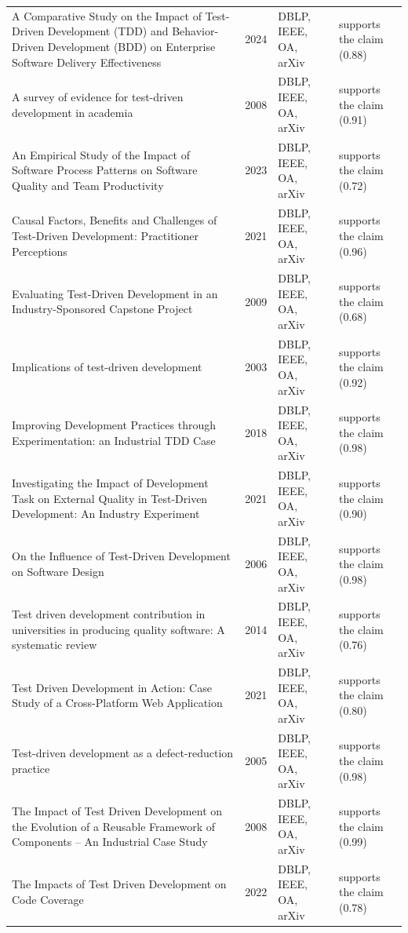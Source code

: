 \begin{longtable}{@{}%
  >{\raggedright\arraybackslash}p{}c%
  >{\raggedright\arraybackslash}p{}%
  >{\raggedright\arraybackslash}p{}@{}}
A Comparative Study on the Impact of Test-Driven Development (TDD) and Behavior-Driven Development (BDD) on Enterprise Software Delivery Effectiveness & 2024 & DBLP, IEEE, OA, arXiv & supports the claim (0.88) \\
A survey of evidence for test-driven development in academia & 2008 & DBLP, IEEE, OA, arXiv & supports the claim (0.91) \\
An Empirical Study of the Impact of Software Process Patterns on Software Quality and Team Productivity & 2023 & DBLP, IEEE, OA, arXiv & supports the claim (0.72) \\
Causal Factors, Benefits and Challenges of Test-Driven Development: Practitioner Perceptions & 2021 & DBLP, IEEE, OA, arXiv & supports the claim (0.96) \\
Evaluating Test-Driven Development in an Industry-Sponsored Capstone Project & 2009 & DBLP, IEEE, OA, arXiv & supports the claim (0.68) \\
Implications of test-driven development & 2003 & DBLP, IEEE, OA, arXiv & supports the claim (0.92) \\
Improving Development Practices through Experimentation: an Industrial TDD Case & 2018 & DBLP, IEEE, OA, arXiv & supports the claim (0.98) \\
Investigating the Impact of Development Task on External Quality in Test-Driven Development: An Industry Experiment & 2021 & DBLP, IEEE, OA, arXiv & supports the claim (0.90) \\
On the Influence of Test-Driven Development on Software Design & 2006 & DBLP, IEEE, OA, arXiv & supports the claim (0.98) \\
Test driven development contribution in universities in producing quality software: A systematic review & 2014 & DBLP, IEEE, OA, arXiv & supports the claim (0.76) \\
Test Driven Development in Action: Case Study of a Cross-Platform Web Application & 2021 & DBLP, IEEE, OA, arXiv & supports the claim (0.80) \\
Test-driven development as a defect-reduction practice & 2005 & DBLP, IEEE, OA, arXiv & supports the claim (0.98) \\
The Impact of Test Driven Development on the Evolution of a Reusable Framework of Components -- An Industrial Case Study & 2008 & DBLP, IEEE, OA, arXiv & supports the claim (0.99) \\
The Impacts of Test Driven Development on Code Coverage & 2022 & DBLP, IEEE, OA, arXiv & supports the claim (0.78) \\

\end{longtable}
